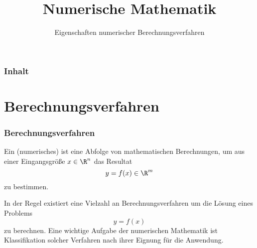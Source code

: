 

\title{Numerische Mathematik}
\subtitle{Eigenschaften numerischer Berechnungsverfahren}



\makeTitlePage

\begin{frame}\frametitle{Inhalt}
   \tableofcontents
\end{frame}
%

%

\section{Berechnungsverfahren}
\makeSectionDividerPage
%
%
\begin{frame}\frametitle{Berechnungsverfahren}
Ein (numerisches)  ist eine Abfolge von mathematischen Berechnungen, um aus einer Eingangsgröße $x \in \R^n$ das Resultat 
$$
y=f(x) \in \R^m
$$
zu bestimmen. \pause

\vfill

In der Regel existiert eine Vielzahl an Berechnungsverfahren um die Lösung eines Problems 
$$
y=f(x)
$$
zu berechnen. Eine wichtige Aufgabe der numerischen Mathematik ist Klassifikation solcher Verfahren nach ihrer Eignung für die Anwendung.

\end{frame}
%
